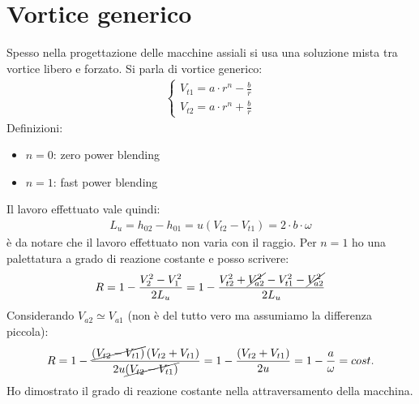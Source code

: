 \section{Vortice generico}
Spesso nella progettazione delle macchine assiali si usa una soluzione mista tra vortice libero e forzato. Si parla di vortice generico:
\begin{align*}
\begin{cases}
V_{t1} = a \cdot r^n - \frac{b}{r}\\
V_{t2} = a \cdot r^n + \frac{b}{r}
\end{cases}
\end{align*}
Definizioni:
\begin{itemize}
\item $n=0$: zero power blending
\item $n=1$: fast power blending
\end{itemize}
Il lavoro effettuato vale quindi:
\begin{align*}
L_u = h_{02} - h_{01} = u \left( V_{t2} - V_{t1} \right) = 2 \cdot b \cdot \omega
\end{align*}
è da notare che il lavoro effettuato non varia con il raggio. Per $n=1$ ho una palettatura a grado di reazione costante e posso scrivere:
\begin{align*}
R = 1 - \frac{V_2^2 - V_1^2}{2 L_u} = 1 - \frac{V_{t2}^2 + \cancel{V_{a2}^2} - V_{t1}^2 - \cancel{V_{a2}^2}}{2 L_u}
\end{align*}
Considerando $V_{a2} \simeq V_{a1}$ (non è del tutto vero ma assumiamo la differenza piccola):
\begin{align*}
R = 1 - \frac{\cancel{\left( V_{t2} - V_{t1} \right)} \left( V_{t2}+ V_{t1} \right)}{2 u \cancel{\left( V_{t2}- V_{t1} \right)}} = 1- \frac{\left( V_{t2}+ V_{t1} \right)}{2 u} = 1-\frac{a}{\omega} = cost.
\end{align*}
Ho dimostrato il grado di reazione costante nella attraversamento della macchina.

